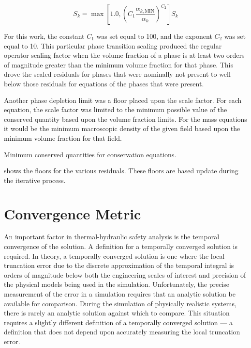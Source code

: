 \begin{equation}
\label{eqn:scaling_factor_small}
S_k = \max[1.0, \left(C_1 \frac{\alpha_{k,\text{MIN}}}{\alpha_k}\right)^{C_2} ] S_k
\end{equation}

For this work, the constant $C_1$ was set equal to 100, and the exponent $C_2$ was set equal to 10.
This particular phase transition scaling produced the regular operator scaling factor when the volume fraction of a phase is at least two orders of magnitude greater than the minimum volume fraction for that phase.
This drove the scaled residuals for phases that were nominally not present to well below those residuals for equations of the phases that were present.

Another phase depletion limit was a floor placed upon the scale factor.
For each equation, the scale factor was limited to the minimum possible value of the conserved quantity based upon the volume fraction limits.
For the mass equations it would be the minimum macroscopic density of the given field based upon the minimum volume fraction for that field.

\begin{table}[ht]
\centering

\caption{Minimum conserved quantities for conservation equations.}
\label{tab:minimumConservedValues}
\end{table}

 shows the floors for the various residuals.
These floors are based update during the iterative process.

\section{Convergence Metric}
\label{sect:temporal_convergence}

An important factor in thermal-hydraulic safety analysis is the temporal convergence of the solution.
A definition for a temporally converged solution is required.
In theory, a temporally converged solution is one where the local truncation error due to the discrete approximation of the temporal integral is orders of magnitude below both the engineering scales of interest and precision of the physical models being used in the simulation.
Unfortunately, the precise measurement of the error in a simulation requires that an analytic solution be available for comparison.
During the simulation of physically realistic systems, there is rarely an analytic solution against which to compare.
This situation requires a slightly different definition of a temporally converged solution --- a definition that does not depend upon accurately measuring the local truncation error.

